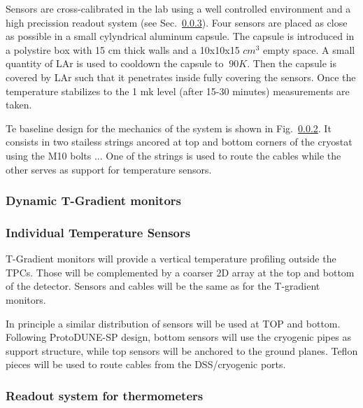 Sensors are cross-calibrated in the lab using a well controlled environment and a high precission readout system (see Sec.~\ref{sec:fdsp-slow-cryo-therm-readout}).
Four sensors are placed as close as possible in a small cylyndrical aluminum capsule. The capsule is introduced in a polystire box with 15 cm thick walls
and a 10x10x15 $cm^3$ empty space. A small quantity of LAr is used to cooldown the capsule to $~90 K$. Then the capsule is covered by LAr such that it penetrates
inside fully covering the sensors. Once the temperature stabilizes to the 1 mk level (after 15-30 minutes) measurements are taken. 

Te baseline design for the mechanics of the system is shown in Fig.~\ref{}. It consists in two stailess strings ancored at top and bottom corners of the cryostat
using the M10 bolts ... One of the strings is used to route the cables while the other serves as support for temperature sensors. 


\subsubsection{Dynamic T-Gradient monitors}

\subsubsection{Individual Temperature Sensors}

T-Gradient monitors will provide a vertical temperature profiling outside the TPCs. Those will be complemented by a coarser 2D array at the top and bottom of the
detector. Sensors and cables will be the same as for the T-gradient monitors.

In principle a similar distribution of sensors will be used at TOP and bottom.
Following ProtoDUNE-SP design, bottom sensors will use the cryogenic pipes as support structure, while top sensors will be anchored to the ground planes.
Teflon pieces will be used to route cables from the DSS/cryogenic ports. 


\subsubsection{Readout system for thermometers}
\label{sec:fdsp-slow-cryo-therm-readout}

